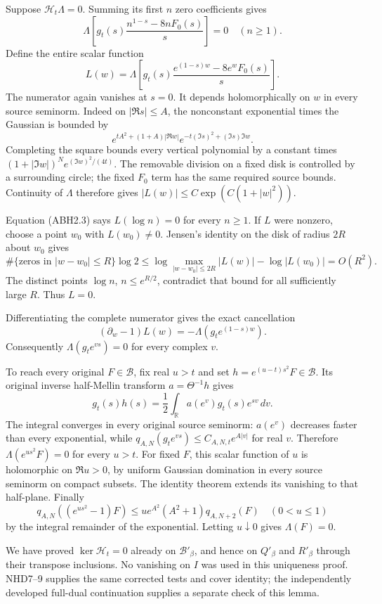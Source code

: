 Suppose \(\mathcal H_t\Lambda=0\). Summing its first \(n\) zero
coefficients gives \[
\Lambda\!\left[g_t(s)\frac{n^{1-s}-8nF_0(s)}s\right]=0
\quad(n\ge1).
\tag{ABH2.3}
\] Define the entire scalar function \[
L(w)=\Lambda\!\left[g_t(s)
\frac{e^{(1-s)w}-8e^wF_0(s)}s\right].
\tag{ABH2.4}
\] The numerator again vanishes at \(s=0\). It depends holomorphically
on \(w\) in every source seminorm. Indeed on \(|\Re s|\le A\), the
nonconstant exponential times the Gaussian is bounded by \[
e^{tA^2+(1+A)|\Re w|}
e^{-t(\Im s)^2+(\Im s)\Im w}.
\] Completing the square bounds every vertical polynomial by a constant
times \((1+|\Im w|)^N e^{(\Im w)^2/(4t)}\). The removable division on a
fixed disk is controlled by a surrounding circle; the fixed \(F_0\) term
has the same required source bounds. Continuity of \(\Lambda\) therefore
gives \(|L(w)|\le C\exp(C(1+|w|^2))\).

Equation (ABH2.3) says \(L(\log n)=0\) for every \(n\ge1\). If \(L\)
were nonzero, choose a point \(w_0\) with \(L(w_0)\ne0\). Jensen's
identity on the disk of radius \(2R\) about \(w_0\) gives \[
\#\{\text{zeros in }|w-w_0|\le R\}\log2
\le \log\max_{|w-w_0|\le2R}|L(w)|-\log|L(w_0)|=O(R^2).
\] The distinct points \(\log n\), \(n\le e^{R/2}\), contradict that
bound for all sufficiently large \(R\). Thus \(L=0\).

Differentiating the complete numerator gives the exact cancellation \[
(\partial_w-1)L(w)=-\Lambda(g_te^{(1-s)w}).
\tag{ABH2.5}
\] Consequently \(\Lambda(g_te^{vs})=0\) for every complex \(v\).

To reach every original \(F\in\mathcal B\), fix real \(u>t\) and set
\(h=e^{(u-t)s^2}F\in\mathcal B\). Its original inverse half-Mellin
transform \(a=\Theta^{-1}h\) gives \[
g_t(s)h(s)=\frac12\int_{\mathbb R}a(e^v)g_t(s)e^{sv}\,dv.
\tag{ABH2.6}
\] The integral converges in every original source seminorm: \(a(e^v)\)
decreases faster than every exponential, while
\(q_{A,N}(g_te^{vs})\le C_{A,N,t}e^{A|v|}\) for real \(v\). Therefore
\(\Lambda(e^{us^2}F)=0\) for every \(u>t\). For fixed \(F\), this scalar
function of \(u\) is holomorphic on \(\Re u>0\), by uniform Gaussian
domination in every source seminorm on compact subsets. The identity
theorem extends its vanishing to that half-plane. Finally \[
q_{A,N}((e^{us^2}-1)F)
\le u e^{A^2}(A^2+1)q_{A,N+2}(F)\quad(0<u\le1)
\] by the integral remainder of the exponential. Letting
\(u\downarrow0\) gives \(\Lambda(F)=0\).

We have proved \(\ker\mathcal H_t=0\) already on \(\mathcal B'_\beta\),
and hence on \(Q'_\beta\) and \(R'_\beta\) through their transpose
inclusions. No vanishing on \(I\) was used in this uniqueness proof.
NHD7--9 supplies the same corrected tests and cover identity; the
independently developed full-dual continuation supplies a separate check
of this lemma.

